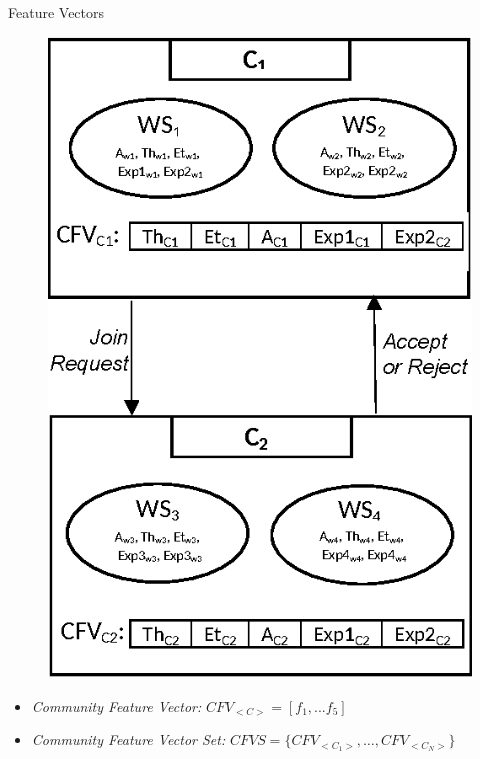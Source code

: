 \documentclass{beamer}
\begin{document}
\begin{frame}{Feature Vectors}

    \begin{figure}[htbp]
        \centering
        \includegraphics[width=0.35 \columnwidth]{figures/cfvs.eps}
    \end{figure}

    \footnotesize
    \begin{itemize}
        \item \emph{Community Feature Vector:} $CFV_{<C>} = [f_1,...f_5]$
        \item \emph{Community Feature Vector Set:} $CFVS = \{CFV_{<C_1>}, \dots, CFV_{<C_N>}\}$
    \end{itemize}
\end{frame}
\end{document}

